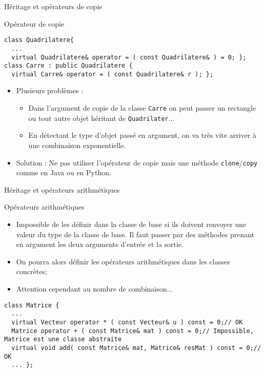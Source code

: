 \documentclass[compress,10pt,aspectratio=169]{beamer}
\begin{document}
\begin{frame}[fragile]{Héritage et opérateurs de copie}
  \scriptsize
  \begin{block}{\small Opérateur de copie}
\begin{verbatim}
class Quadrilatere{
  ...
  virtual Quadrilatere& operator = ( const Quadrilatere& ) = 0; };
class Carre : public Quadrilatere {
  virtual Carre& operator = ( const Quadrilatere& r ); };
\end{verbatim}

\begin{itemize}
  \item \alert{Plusieurs problèmes} :
  \begin{itemize}
  \scriptsize
  \item Dans l'argument de copie de la classe \texttt{Carre} 
        on peut passer un rectangle ou tout autre objet héritant de 
        \texttt{Quadrilater}...
  \item En détectant le type d'objet passé en argument, on va très vite 
        arriver à une combinaison exponentielle.
  \end{itemize}
  \item {\color{blue}Solution} : Ne pas utiliser l'opérateur de copie mais
  une méthode \texttt{clone}/\texttt{copy} comme en Java ou en Python.
  \end{itemize}
  \end{block}
\end{frame}

\begin{frame}[fragile]{Héritage et opérateurs arithmétiques}
  \scriptsize
  \begin{block}{\small Opérateurs arithmétiques}
  \begin{itemize}
  \item Impossible de les définir dans la classe de base si ils doivent renvoyer une valeur du type de la classe de base. Il faut passer par des méthodes prenant en argument les deux arguments d'entrée et la sortie.
  \item On pourra alors définir les opérateurs arithmétiques dans les classes concrètes;
  \item Attention cependant au nombre de combinaison...
  \end{itemize}
  \begin{verbatim}
class Matrice {
  ...
  virtual Vecteur operator * ( const Vecteur& u ) const = 0;// OK
  Matrice operator + ( const Matrice& mat ) const = 0;// Impossible, Matrice est une classe abstraite
  virtual void add( const Matrice& mat, Matrice& resMat ) const = 0;// OK
  ... };
\end{verbatim}
\end{block}
\end{frame}
  
\end{document}
